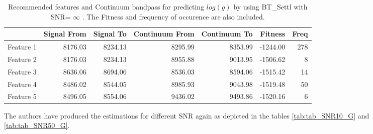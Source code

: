\begin{table}
\begin{center}
\begin{tabular}{rrrrrrr}
  \hline
 & Signal From & Signal To & Continuum From & Continuum To & Fitness & Freq \\ 
  \hline
Feature 1 & 8176.03 & 8234.13 & 8295.99 & 8353.99 & -1244.00 & 278 \\ 
  Feature 2 & 8176.03 & 8234.13 & 8955.88 & 9013.95 & -1506.62 &   8 \\ 
  Feature 3 & 8636.06 & 8694.06 & 8536.03 & 8594.06 & -1515.42 &  14 \\ 
  Feature 4 & 8486.02 & 8544.05 & 8985.93 & 9043.98 & -1519.48 &  50 \\ 
  Feature 5 & 8496.05 & 8554.06 & 9436.02 & 9493.86 & -1520.16 &   6 \\ 
   \hline
\end{tabular}
\caption {Recommended features and Continuum bandpass for predicting $log(g)$ 
      by using BT\_Settl with SNR= $ \infty $ . 
      The Fitness and frequency of occurence are also included.} \label{tab:tab_SNRoo_G} 
\end{center}
\end{table}

The authors have produced the estimations for different SNR again 
as depicted in the tables \ref{tab:tab_SNR10_G} and \ref{tab:tab_SNR50_G}.

